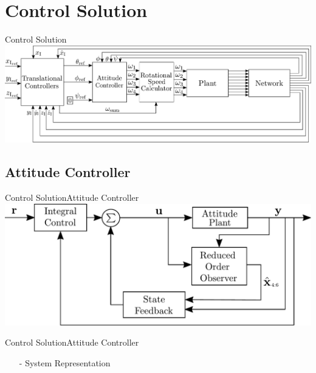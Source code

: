\section{Control Solution}
\begin{frame}{Control Solution}{}
    \centering
    \includegraphics[scale=0.2]{figures/ControlDiagramPoster}
\end{frame}

\subsection{Attitude Controller}
\begin{frame}{Control Solution}{Attitude Controller}
    \centering
    \includegraphics[scale=0.35]{figures/AttitudeControlDiagram}    
\end{frame}

\begin{frame}{Control Solution}{Attitude Controller}
    \begin{itemize}
        \item[-] System Representation
    \end{itemize}

%        
\end{frame}


